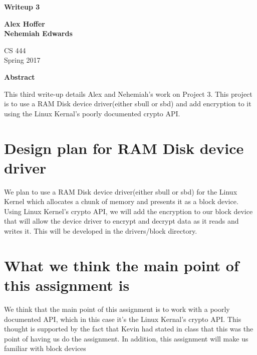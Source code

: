 \documentclass[letterpaper,10pt,titlepage]{article}
\begin{document}
\begin{titlepage}
    \begin{center}
        \vspace*{3.5cm}

        \textbf{Writeup 3}

        \vspace{0.5cm}

        \textbf{Alex Hoffer\\}
	\textbf{Nehemiah Edwards}

        \vspace{0.8cm}

        CS 444\\
        Spring 2017\\

        \vspace{1cm}

        \textbf{Abstract}\\

        \vspace{0.5cm}

	This third write-up details Alex and Nehemiah's work on Project 3. This project is to use a RAM Disk device driver(either sbull or sbd) and add encryption to it using the Linux Kernal's poorly documented crypto API.

        \vfill

    \end{center}
\end{titlepage}

\newpage

\tableofcontents

\newpage

\section{Design plan for RAM Disk device driver}
We plan to use a RAM Disk device driver(either sbull or sbd) for the Linux Kernel which allocates a chunk of memory and presents it as a block device. Using Linux Kernel's crypto API, we will add the encryption to our block device that will allow the device driver to encrypt and decrypt data as it reads and writes it. This will be developed in the drivers/block directory.

\section{What we think the main point of this assignment is}
We think that the main point of this assignment is to work with a poorly documented API, which in this case it's the Linux Kernal's crypto API. This thought is supported by the fact that Kevin had stated in class that this was the point of having us do the assignment. In addition, this assignment will make us familiar with block devices
\end{document}
